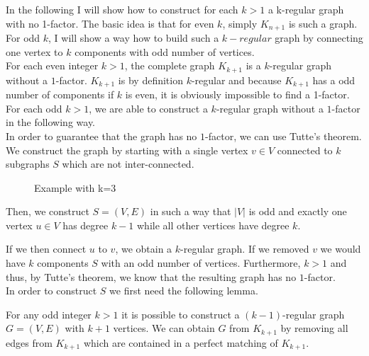 \documentclass[a4paper]{article}
\begin{document}
	\begin{solution}{11}
		In the following I will show how to construct for each $k>1$ a k-regular graph with no 1-factor. 
		The basic idea is that for even $k$, simply $K_{n+1}$ is such a graph. 
		For odd $k$,  I will show a way how to build such a $k-regular$ graph by connecting one vertex to $k$ components with odd number of vertices.  \\ 
		
		
		For each even integer $k > 1$, the complete graph $K_{k+1}$ is a $k$-regular graph without a $1$-factor. 
		$K_{k+1}$ is by definition $k$-regular and because $K_{k+1}$ has a odd number of components if $k$ is even, it is obviously impossible to find a 1-factor. 
		For each odd $k > 1$, we are able to construct a $k$-regular graph without a $1$-factor in the following way. \\
		
		In order to guarantee that the graph has no $1$-factor, we can use Tutte's theorem. We construct the graph by starting with a single vertex $v \in V$ connected to $k$ subgraphs $S$ which are not inter-connected. 
		\begin{figure}[h]
			\centering
		\caption{Example with k=3}
		\end{figure}
		Then, we construct $S=(V,E)$ in such a way that $|V|$ is odd and exactly one vertex $u \in V$ has degree $k-1$ while all other vertices have degree $k$.
 
		If we then connect $u$ to $v$, we obtain a $k$-regular graph. If we removed $v$ we would have $k$ components $S$ with an odd number of vertices. Furthermore, $k > 1$ and thus, by Tutte's theorem, we know that the resulting graph has no $1$-factor.\\
		
		In order to construct $S$ we first need the following lemma.
		\begin{lemma}{For any odd integer $k > 1$ it is possible to construct a $(k-1)$-regular graph $G=(V,E)$ with $k+1$ vertices.}
			We can obtain $G$ from $K_{k+1}$ by removing all edges from $K_{k+1}$ which are contained in a perfect matching of $K_{k+1}$. 


\end{lemma}
\end{solution}
\end{document}
